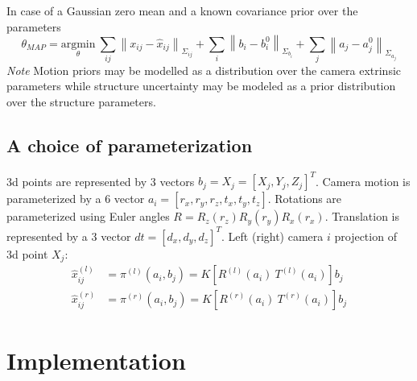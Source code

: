 \documentclass[10pt]{article}         %
\begin{document}
In case of a Gaussian zero mean and a known covariance  prior over the parameters
\[
\theta_{MAP} = \underset{\theta}{\text{argmin}}\ \sum_{ij}\left\|
  x_{ij}-\hat{x}_{ij}\right\|_{\Sigma_{ij}} + \sum_i
\left\|b_i-b_i^0\right\|_{\Sigma_{b_i}} + \sum_j\left\|a_j-a_j^0\right\|_{\Sigma_{a_j}}
\]
\emph{Note} Motion priors may be modelled as a distribution over
the camera extrinsic parameters while structure uncertainty may be
modeled as a prior distribution over the structure parameters.

\subsection{A choice of parameterization}

3d points are represented by 3 vectors $b_j = X_j = [X_j,Y_j,Z_j]^T$.
Camera motion is parameterized by a 6 vector
$a_i = [r_x,r_y,r_z,t_x,t_y,t_z]$.  Rotations are parameterized using
Euler angles $ R = R_z(r_z)R_y(r_y)R_x(r_x)$.  Translation is
represented by a 3 vector $ dt = [d_x,d_y,d_z]^T$. Left (right) camera
$i$ projection of 3d point $X_j$:
$$
\begin{aligned}
  \hat{x}^{(l)}_{ij} &= \pi^{(l)}(a_i,b_j) = K[R^{(l)}(a_i)\ T^{(l)}(a_i)]b_j\\
  \hat{x}^{(r)}_{ij} &= \pi^{(r)}(a_i,b_j) = K[R^{(r)}(a_i)\
  T^{(r)}(a_i)]b_j
\end{aligned}
$$

\section{Implementation}
\end{document}
